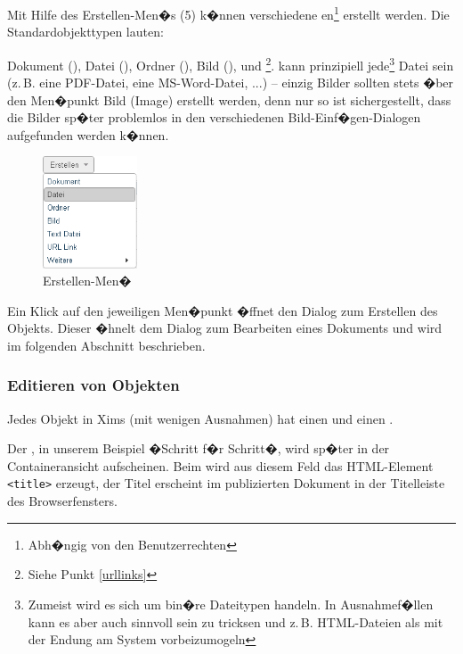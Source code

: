 Mit Hilfe des Erstellen-Men�s (5) k�nnen verschiedene
en\footnote{Abh�ngig von den Benutzerrechten}
erstellt werden. Die Standardobjekttypen lauten:

Dokument (), Datei (), Ordner
(), Bild (),  und
\footnote{Siehe Punkt \ref{urllinks}}.
 kann prinzipiell jede\footnote{Zumeist wird es sich um
  bin�re Dateitypen handeln. In Ausnahmef�llen kann es aber auch
  sinnvoll sein zu tricksen und z.\,B. HTML-Dateien als
   mit der Endung  am System vorbeizumogeln}
Datei sein (z.\,B. eine PDF-Datei, eine MS-Word-Datei, ...) -- einzig
Bilder sollten stets �ber den Men�punkt Bild (Image) erstellt werden,
denn nur so ist sichergestellt, dass die Bilder sp�ter problemlos in
den verschiedenen Bild-Einf�gen-Dialogen aufgefunden werden k�nnen.

\begin{figure}[!ht] 
  \centering
  \includegraphics[width=0.25\textwidth]{./images/create-menu.png}
  \caption{Erstellen-Men�}
  \label{fig:erstellenmenu}
\end{figure}

Ein Klick auf den jeweiligen Men�punkt �ffnet den Dialog zum Erstellen
des Objekts. Dieser �hnelt dem Dialog zum Bearbeiten eines Dokuments
und wird im folgenden Abschnitt beschrieben.

\subsubsection{Editieren von Objekten}
\label{quick-editieren}

Jedes Objekt in Xims (mit wenigen Ausnahmen) hat einen  und 
einen .

Der , in unserem Beispiel �Schritt f�r Schritt�, wird
sp�ter in der Containeransicht aufscheinen. Beim 
 wird aus diesem Feld das HTML-Element
\texttt{<title>} erzeugt, der Titel erscheint im publizierten Dokument
in der Titelleiste des Browserfensters.

